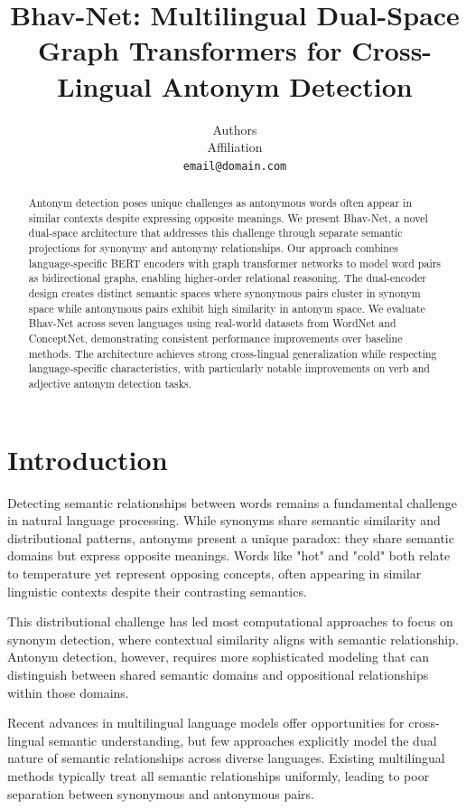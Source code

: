 \documentclass[11pt]{article}
\title{Bhav-Net: Multilingual Dual-Space Graph Transformers for Cross-Lingual Antonym Detection}
\author{Authors \\
  Affiliation \\
  \texttt{email@domain.com}
}
\begin{document}
\maketitle

\begin{abstract}
Antonym detection poses unique challenges as antonymous words often appear in similar contexts despite expressing opposite meanings. We present Bhav-Net, a novel dual-space architecture that addresses this challenge through separate semantic projections for synonymy and antonymy relationships. Our approach combines language-specific BERT encoders with graph transformer networks to model word pairs as bidirectional graphs, enabling higher-order relational reasoning. The dual-encoder design creates distinct semantic spaces where synonymous pairs cluster in synonym space while antonymous pairs exhibit high similarity in antonym space. We evaluate Bhav-Net across seven languages using real-world datasets from WordNet and ConceptNet, demonstrating consistent performance improvements over baseline methods. The architecture achieves strong cross-lingual generalization while respecting language-specific characteristics, with particularly notable improvements on verb and adjective antonym detection tasks.
\end{abstract}

\section{Introduction}

Detecting semantic relationships between words remains a fundamental challenge in natural language processing. While synonyms share semantic similarity and distributional patterns, antonyms present a unique paradox: they share semantic domains but express opposite meanings. Words like "hot" and "cold" both relate to temperature yet represent opposing concepts, often appearing in similar linguistic contexts despite their contrasting semantics.

This distributional challenge has led most computational approaches to focus on synonym detection, where contextual similarity aligns with semantic relationship. Antonym detection, however, requires more sophisticated modeling that can distinguish between shared semantic domains and oppositional relationships within those domains.

Recent advances in multilingual language models offer opportunities for cross-lingual semantic understanding, but few approaches explicitly model the dual nature of semantic relationships across diverse languages. Existing multilingual methods typically treat all semantic relationships uniformly, leading to poor separation between synonymous and antonymous pairs.
\end{document}
